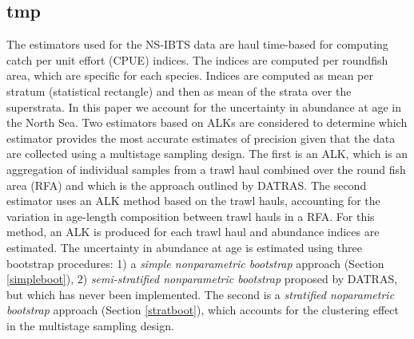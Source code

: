 \documentclass[a4paper 12pt]{article}
\numberwithin{equation}{section}
\begin{document}





\subsection{tmp}

The estimators used for the NS-IBTS data are haul time-based for computing catch per unit effort (CPUE) indices. The indices are computed per roundfish area, which are specific for each species. Indices are computed as mean per stratum (statistical rectangle) and then as mean of the strata  over the superstrata.  In this paper we account for the uncertainty in abundance at age in the North Sea. Two estimators based on ALKs are considered to determine which estimator provides the most accurate estimates of precision given that the data are collected using a multistage sampling design. The first is an ALK, which is an aggregation of individual samples from a trawl haul combined over the round fish area (RFA) and which is the approach outlined by DATRAS. The second estimator uses an ALK method based on the trawl hauls, accounting for the variation in age-length composition between trawl hauls in a RFA. For this method, an ALK is produced for each trawl haul and abundance indices are estimated. The uncertainty in abundance at age is estimated using three bootstrap procedures: 1) a \emph{simple nonparametric bootstrap} approach (Section \ref{simpleboot}), 2) \emph{semi-stratified nonparametric bootstrap}  proposed by DATRAS, but which has never been implemented. The second is a \emph{stratified noparametric bootstrap} approach (Section \ref{stratboot}), which accounts for the clustering effect in the multistage sampling design. 

\end{document}
